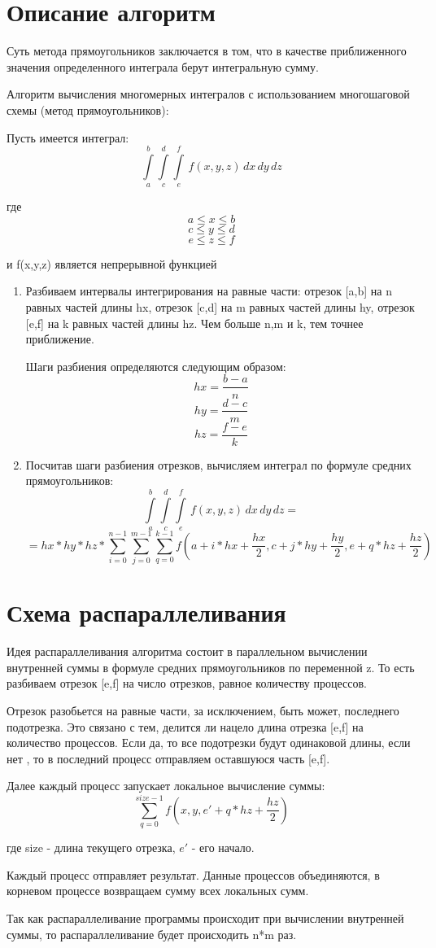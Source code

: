 \documentclass{report}
\begin{document}
\section*{Описание алгоритм}
Суть метода прямоугольников заключается в том, что в качестве приближенного значения определенного интеграла берут интегральную сумму.
\par Алгоритм вычисления многомерных интегралов с использованием многошаговой схемы (метод прямоугольников):
\par Пусть имеется интеграл:
$$\int\limits_a^b 
\int\limits_c^d 
\int\limits_e^f \,f(x,y,z)\,dx\,dy\,dz
$$
\par где 
$$ a\le x \le b $$
$$ c \le y \le d $$
$$ e \le z \le f $$
\par и f(x,y,z) является непрерывной функцией
\begin{enumerate}
\item Разбиваем интервалы интегрирования на равные части: отрезок [a,b] на n равных частей длины hx, отрезок [c,d] на m равных частей длины hy, отрезок [e,f] на k равных частей длины hz. Чем больше n,m и k, тем точнее приближение.
\par Шаги разбиения определяются следующим образом:
$$ hx=\frac{b-a}{n} $$
$$ hy=\frac{d-c}{m} $$
$$ hz=\frac{f-e}{k} $$
\item Посчитав шаги разбиения отрезков, вычисляем интеграл по формуле средних прямоугольников:
$$\int\limits_a^b 
\int\limits_c^d 
\int\limits_e^f \,f(x,y,z)\,dx\,dy\,dz=$$
$$ = hx*hy*hz*
\sum\limits_{i=0}^{n-1}
\sum\limits_{j=0}^{m-1}
\sum\limits_{q=0}^{k-1}
f(a+i*hx+\frac{hx}{2}, c+j*hy+\frac{hy}{2},e+q*hz+\frac{hz}{2})
$$
\end{enumerate}
\par
\par 
\newpage

\section*{Схема распараллеливания}
Идея распараллеливания алгоритма состоит в параллельном вычислении внутренней суммы в формуле средних прямоугольников по переменной z. То есть разбиваем отрезок [e,f] на число отрезков, равное количеству процессов. 
\par Отрезок разобьется на равные части, за исключением, быть может, последнего подотрезка. Это связано с тем, делится ли нацело длина отрезка [e,f] на количество процессов. Если да, то все подотрезки будут одинаковой длины, если нет , то в последний процесс отправляем оставшуюся часть [e,f].
\par Далее каждый процесс запускает локальное вычисление суммы:
$$
\sum\limits_{q=0}^{size-1}
f(x, y,e'+q*hz+\frac{hz}{2})
$$
\par где size - длина текущего отрезка, $e \prime$ - его начало.
\par Каждый процесс отправляет результат. Данные процессов объединяются, в корневом процессе возвращаем сумму всех локальных сумм. 
\par Так как распараллеливание программы происходит при вычислении внутренней суммы, то распараллеливание будет происходить n*m раз.
\newpage
\end{document}
